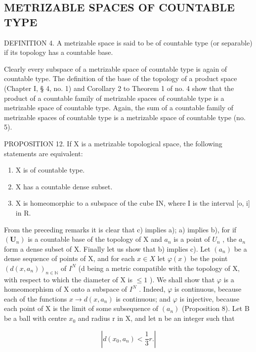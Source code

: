 \subsection{METRIZABLE SPACES OF COUNTABLE TYPE}

DEFINITION 4. A metrizable space is said to be of countable type (or separable) if its topology has a countable base.

Clearly every subspace of a metrizable space of countable type is again of countable type. The definition of the base of the topology of a product space (Chapter I, § 4, no. 1) and Corollary 2 to Theorem 1 of no. 4 show that the product of a countable family of metrizable spaces of countable type is a metrizable space of countable type. Again, the sum of a countable family of metrizable spaces of countable type is a metrizable space of countable type (no. 5).

PROPOSITION 12. If X is a metrizable topological space, the following statements are equivalent:

\begin{enumerate}
\def\labelenumi{\alph{enumi})}
\item
  X is of countable type.
\item
  X has a countable dense subset.
\item
  X is homeomorphic to a subspace of the cube IN, where I is the interval {[}o, i{]} in R.
\end{enumerate}

From the preceding remarks it is clear that c) implies a); a) implies b), for if \((\mathbf{U}_{n})\) is a countable base of the topology of X and \(a_{n}\) is a point of \(U_{n}\) , the \(a_{n}\) form a dense subset of X. Finally let us show that b) implies c). Let \((a_{n})\) be a dense sequence of points of X, and for each \(x \in X\) let \(\varphi(x)\) be the point \((d(x, a_{n}))_{n \in \mathbb{N}}\) of \(I^{N}\) (d being a metric compatible with the topology of X, with respect to which the diameter of X is \(\leqslant 1\) ). We shall show that \(\varphi\) is a homeomorphism of X onto a subspace of \(I^{N}\) . Indeed, \(\varphi\) is continuous, because each of the functions \(x \to d(x, a_{n})\) is continuous; and \(\varphi\) is injective, because each point of X is the limit of some subsequence of \((a_{n})\) (Proposition 8). Let B be a ball with centre \(x_{0}\) and radius r in X, and let n be an integer such that

\[
\left| d (x _ {0}, a _ {n}) <   \frac {1}{3} r. \right|
\]

